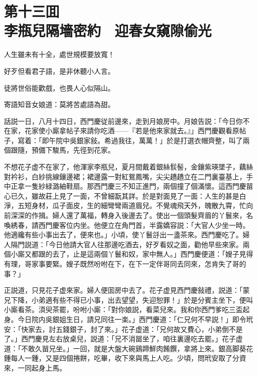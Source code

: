 
\chapter*{第十三囬　\\李瓶兒隔墻密約　迎春女窺隙偷光}


\begin{myquote}
人生雖未有十全，處世規模要放寬！

好歹但看君子語，是非休聽小人言。

徒將世俗能歡戲，也畏人心似隔山。

寄語知音女娘道：莫將苦處語為甜。
\end{myquote}

話説一日，八月十四日，西門慶従前邊來，走到月娘房中。月娘告説：「今日你不在家，花家使小廝拿帖子來請你吃酒——『若是他來家就去。』」西門慶觀看原帖子，寫着：「即午院中吳銀家敍。希過我往，萬萬！」於是打選衣帽齊整，叫了兩個跟隨，預備下駿馬，先徑到花家。

不想花子虚不在家了，他渾家李瓶兒，夏月間戴着銀絲䯼髻，金鑲紫瑛墜子，藕絲對衿衫，白紗挑線鑲邊裙；裙邊露一對紅鴛鳳嘴，尖尖趫趫立在二門裏臺基上，手中正拿一隻紗緑潞紬鞋扇。那西門慶三不知正進門，兩個撞了個滿懷。這西門慶㽞心已久，雖故莊上見了一面，不曾細翫其詳。於是對面見了一面：人生的甚是白淨，五短身材，瓜子面皮，生的細彎彎兩道眉兒。不覺魂飛天外，魄散九霄，忙向前深深的作揖。婦人還了萬福，轉身入後邊去了。使出一個頭髮齊眉的丫鬟來，名喚綉春，請西門慶客位内坐。他便立在角門首，半露嬌容説：「大官人少坐一時。他適纔有些小事出去了，便來也。」小頃，使丫鬟㧱出一盞茶來。西門慶吃了。婦人隔門説道：「今日他請大官人往那邊吃酒去，好歹看奴之面，勸他早些來家。兩個小廝又都跟的去了，止是這兩個丫鬟和奴，家中無人。」西門慶便道：「嫂子見得有理，哥家事要緊。嫂子既然吩咐在下，在下一定伴哥同去同來，怎肯失了哥的事？」

正説道，只見花子虚來家。婦人便囬房中去了。花子虚見西門慶敍禮，説道：「蒙兄下降，小弟適有些不得已小事，出去望望，失迎恕罪！」於是分賓主坐下，便叫小廝看茶。湏臾茶罷，吩咐小廝：「對你娘説，看菜兒來。我和你西門爹吃三盃起身。今日院内吳銀姐生日，請兄同往一楽。」西門慶道：「仁兄何不早説！」即令玳安：「快家去，討五錢銀子，封了來。」花子虚道：「兄何故又費心，小弟倒不是了。」西門慶見左右放桌兒，説道：「兄不消㽞坐了，咱往裏邊吃去罷。」花子虚道：「不敢久㽞兄坐。」一回，就是大盤大碗鷄蹄鮮肉餚饌，拿將上來。銀高脚葵花鍾每人一鍾，又是四個捲餅，吃畢，收下來與馬上人吃。少頃，問玳安取了分資來，一同起身上馬。

